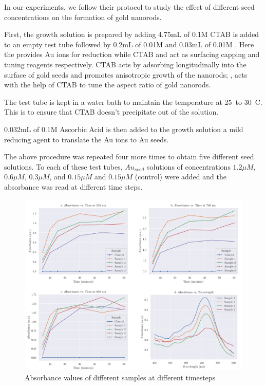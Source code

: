 \documentclass[journal=jacsat,manuscript=article]{achemso}
\begin{document}
In our experiments, we follow their protocol to study the effect of different seed concentrations on the formation of gold nanorods.

First, the growth solution is prepared by adding 4.75mL of 0.1M CTAB is added to an empty test tube followed by 0.2mL of 0.01M  and 0.03mL of 0.01M . Here the  provides Au ions for reduction while CTAB and  act as surfacing capping and tuning reagents respectively. CTAB acts by adsorbing longitudinally into the surface of gold seeds and promotes anisotropic growth of the nanorods; , acts with the help of CTAB to tune the aspect ratio of gold nanorods.

The test tube is kept in a water bath to maintain the temperature at 25\degree\ to 30\degree\ C. This is to ensure that CTAB doesn't precipitate out of the solution.

0.032mL of 0.1M Ascorbic Acid is then added to the growth solution a mild reducing agent to translate the Au ions to Au seeds.

The above procedure was repeated four more times to obtain five different seed solutions. To each of these test tubes, $Au_{seed}$ solutions of concentrations $1.2\mu M$, $0.6\mu M$, $0.3 \mu M$, and $0.15 \mu M$ and $0.15 \mu M$ (control) were added and the absorbance was read at different time steps.

\begin{figure}[h!]
  \centering
  \includegraphics[width=1\textwidth]{data/gn/combined.png}
  \caption{Absorbance values of different samples at different timesteps}\label{fig_gn_1}
\end{figure}
\end{document}
